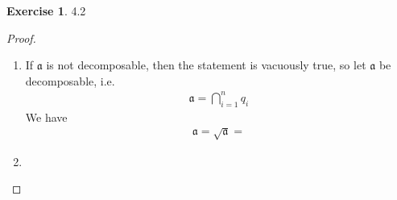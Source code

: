 \documentclass{book}
\theoremstyle{plain}
\theoremstyle{definition}
\newtheorem{exr}[thm]{Exercise}
\theoremstyle{custom_definition}
\begin{document}
\begin{exr}
    4.2
\end{exr}

\begin{proof}
    \begin{enumerate}
        \item If \(\mathfrak{a}\) is not decomposable, then the statement is vacuously true, so let \(\mathfrak{a}\) be decomposable, i.e.
        \begin{align}
            \mathfrak{a} = \bigcap_{i=1}^n q_i
        \end{align}
        We have
        \begin{align}
            \mathfrak{a} = \sqrt{\mathfrak{a}} = 
        \end{align}
        \item 
    \end{enumerate}
\end{proof}
\end{document}
